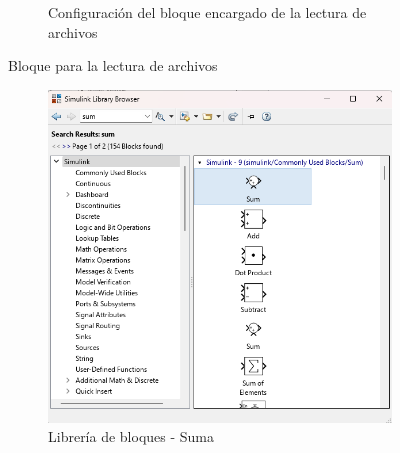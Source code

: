 \begin{figure}[htbp]
\begin{subfigure}[b]{0.45\textwidth}
        \caption{Configuración del bloque encargado de la lectura de archivos}
        \label{fig:config_from_file_IMU}
    \end{subfigure}
    \caption{Bloque para la lectura de archivos}
    \label{fig:read_from_file}
\end{figure}


\begin{figure}[htbp]
    \centering
    \begin{subfigure}[b]{0.35\textwidth}
        \centering
        \includegraphics[width=\textwidth]{fig/Capitulo5/Caso_de_estudio_IMU/Generador_de_salidas/libreia_de_bloques_suma.png}
        \caption{Librería de bloques - Suma}
        \label{fig:lib_bloques_add_IMU}
    \end{subfigure}
    \hfill
    \begin{subfigure}[b]{0.45\textwidth}
        \centering

\end{subfigure}
\end{figure}
